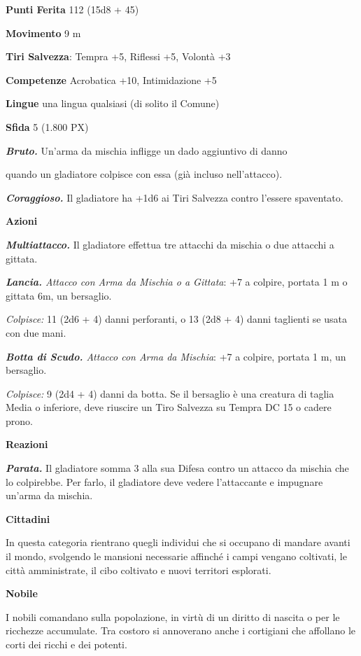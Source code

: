 \begin{multicols}{2}
\textbf{Punti Ferita} 112 (15d8 + 45)

\textbf{Movimento} 9 m

\textbf{Tiri Salvezza}: Tempra +5, Riflessi +5, Volontà +3

\textbf{Competenze} Acrobatica +10, Intimidazione +5

\textbf{Lingue} una lingua qualsiasi (di solito il Comune)

\textbf{Sfida} 5 (1.800 PX)

\textit{\textbf{Bruto.}} Un'arma da mischia infligge un dado aggiuntivo di danno

quando un gladiatore colpisce con essa (già incluso nell'attacco).

\textit{\textbf{Coraggioso.}} Il gladiatore ha +1d6 ai Tiri Salvezza contro l'essere spaventato.

\textbf{Azioni}

\textit{\textbf{Multiattacco.}} Il gladiatore effettua tre attacchi da mischia o due attacchi a gittata.

\textit{\textbf{Lancia.} Attacco con Arma da Mischia o a Gittata}: +7 a colpire, portata 1 m o gittata 6m, un bersaglio.

\textit{Colpisce:} 11 (2d6 + 4) danni perforanti, o 13 (2d8 + 4) danni taglienti se usata con due mani.

\textit{\textbf{Botta di Scudo.} Attacco con Arma da Mischia}: +7 a colpire, portata 1 m, un bersaglio.

\textit{Colpisce:} 9 (2d4 + 4) danni da botta. Se il bersaglio è una creatura di taglia Media o inferiore, deve riuscire un Tiro Salvezza su Tempra DC 15 o cadere prono.

\textbf{Reazioni}

\textit{\textbf{Parata.}} Il gladiatore somma 3 alla sua Difesa contro un attacco da mischia che lo colpirebbe. Per farlo, il gladiatore deve vedere l'attaccante e impugnare un'arma da mischia.

\medskip\textbf{Cittadini}

In questa categoria rientrano quegli individui che si occupano di mandare avanti il mondo, svolgendo le mansioni necessarie affinché i campi vengano coltivati, le città amministrate, il cibo coltivato e
nuovi territori esplorati.

\medskip\textbf{Nobile}

I nobili comandano sulla popolazione, in virtù di un diritto di nascita o per le ricchezze accumulate. Tra costoro si annoverano anche i cortigiani che affollano le corti dei ricchi e dei potenti.


\end{multicols}
